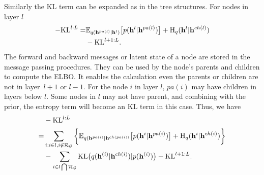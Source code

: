 \documentclass[conference]{IEEEtran}
\begin{document}
Similarly the KL term can be expanded as in the tree structures. For nodes in layer $l$
\begin{align} \label{eq:KL_dag1}
-\text{KL}^{l:L} 
=&     \mathbb{E}_{q(\mathbf{h}^{pa(l)}|\mathbf{h}^l)} \big[  p( \mathbf{h}^{l}|  \mathbf{h}^{pa(l)})    \big]  +  \text{H}_q(\mathbf{h}^{l}|\mathbf{h}^{ch(l)}) \\ \notag
& - \text{KL}^{l+1:L}.
\end{align}
The forward and backward messages or latent state of a node are stored in the message passing procedures. They can be used by the node's parents and children  to compute the ELBO.  
It enables the calculation even the parents or children are  not  in layer~$l+1$ or $l-1$. For the node $i$ in layer $l$,   $pa(i)$ may have children in layers below $l$. Some nodes in $l$ may not have parent, and combining with the prior, the entropy term will become an KL term in this case.  Thus,  we have 
\begin{align} \label{eq:KL_dag2}
&-\text{KL}^{l:L} \\ \notag
=&   \sum_{i:i\in l, i \not\in   \mathcal{R}_{ \mathcal{G}} }  \bigg\{ \mathbb{E}_{q(\mathbf{h}^{pa(i)}|\mathbf{h}^{ch(pa(i))}} \big[  p( \mathbf{h}^{i}|  \mathbf{h}^{pa(i)})    \big]   +  \text{H}_q(\mathbf{h}^{i}|\mathbf{h}^{ch(i)})  \bigg\}  \\ \notag
& -  \sum_{i \in l \bigcap \mathcal{R}_{ \mathcal{G} }  }  \text{KL}\big(q(\mathbf{h}^{(i)} | \mathbf{h}^{ch(i)} )   | p(\mathbf{h}^{(i)})  \big)  - \text{KL}^{l+1:L}. \notag
\end{align}
\end{document}
